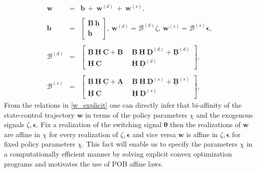 \documentclass[letterpaper,11pt]{article}
\newcommand{\AR}[2]{\left[\begin{array}{#1}#2\end{array}\right]}
\begin{document}
\begin{eqnarray}
\label{w_explicit}
 \nonumber
\mathbf{w} & = & \bm{b}~ +~
 \mathbf{w}^{(d)} ~ + ~  \mathbf{w}^{(s)}, \\
 \nonumber
 \\
 \nonumber
 \bm{b} & = & \AR{c}{ \underline{\mathbf{B}} ~ 	\underline{\mathbf{h}} \\ 	\underline{\mathbf{h}}}, ~
 \mathbf{w}^{(d)}   =  \bm{\mathcal{B}}^{(d)}  \zeta, ~
 \mathbf{w}^{(s)} = \bm{\mathcal{B}}^{(s)}  \bm{\epsilon},
 \\
 \nonumber
 \\
\nonumber 
 \bm{\mathcal{B}}^{(d)} & = &  \AR{cc}{\underline{\mathbf{B}} ~ 
	\underline{\mathbf{H}}~ \underline{\mathbf{C}} + \underline{\mathbf{B}} ~ &~  
\underline{\mathbf{B}} ~ 
	\underline{\mathbf{H}}~ \underline{\mathbf{D}}^{(d)} + \underline{\mathbf{B}}^{(d)}  \\
	\underline{\mathbf{H}}~ \underline{\mathbf{C}}  ~ &~  
	\underline{\mathbf{H}}~ \underline{\mathbf{D}}^{(d)}  }, \\
\nonumber
\\
 \bm{\mathcal{B}}^{(s)} & = & \AR{cc}{\underline{\mathbf{B}} ~ 
	\underline{\mathbf{H}}~ \underline{\mathbf{C}} + \underline{\mathbf{A}} ~ &~  
	\underline{\mathbf{B}} ~ 
	\underline{\mathbf{H}}~ \underline{\mathbf{D}}^{(s)} + \underline{\mathbf{B}}^{(s)}  \\
	\underline{\mathbf{H}}~ \underline{\mathbf{C}}  ~ &~  
	\underline{\mathbf{H}}~ \underline{\mathbf{D}}^{(s)}  }, 
\end{eqnarray}
From the  relations in \eqref{w_explicit} one can directly infer that bi-affinity of the state-control trajectory $ \mathbf{w}$ in terms of the policy parameters 
$ \chi$ and the exogenous signals $\zeta, \bm{\epsilon}$. Fix a realization of the switching signal $ \bm{\theta}$ then the realizations of  $\mathbf{w}$
are  affine in   $\chi $ for every realization of $\zeta, \bm{\epsilon}$ and vice versa $\mathbf{w}$  is affine in  $\zeta, \bm{\epsilon}$  for fixed policy parameters $ \chi$.
This fact will enable us to specify the parameters $ \chi$ in a computationally efficient manner by solving  explicit convex optimization programs and motivates the use of POB affine laws. 
\end{document}
